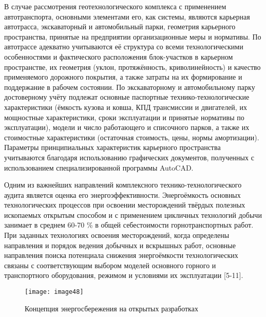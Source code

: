 \begin{multicols}{2}
В случае рассмотрения геотехнологического комплекса с применением
автотранспорта, основными элементами его, как системы, являются
карьерная автотрасса, экскаваторный и автомобильный парки, геометрия
карьерного пространства, принятые на предприятии организационные меры и
нормативы. По автотрассе адекватно учитываются её структура со всеми
технологическими особенностями и фактического расположения блок-участков
в карьерном пространстве, их геометрия (уклон, протяжённость,
криволинейность) и качество применяемого дорожного покрытия, а также
затраты на их формирование и поддержание в рабочем состоянии. По
экскаваторному и автомобильному парку достоверному учёту подлежат
основные паспортные технико-технологические характеристики (ёмкость
кузова и ковша, КПД трансмиссии и двигателей, их мощностные
характеристики, сроки эксплуатации и принятые нормативы по
эксплуатации), модели и число работающего и списочного парков, а также
их стоимостные характеристики (остаточная стоимость, цены, нормы
амортизации). Параметры принципиальных характеристик карьерного
пространства учитываются благодаря использованию графических документов,
полученных с использованием специализированной программы AutoCAD.

Одним из важнейших направлений комплексного технико-технологического
аудита является оценка его энергоэффективности. Энергоёмкость основных
технологических процессов при освоении месторождений твёрдых полезных
ископаемых открытым способом и с применением цикличных технологий добычи
занимает в среднем 60-70 \% в общей себестоимости горнотранспортных
работ. При заданных технологиях освоения месторождений, когда определены
направления и порядок ведения добычных и вскрышных работ, основные
направления поиска потенциала снижения энергоёмкости технологических
связаны с соответствующим выбором моделей основного горного и
транспортного оборудования, режимом и условиями их эксплуатации
{[}5-11{]}.

\end{multicols}

\begin{figure}[H]
    \centering
    \texttt{[image: image48]}
    \caption{Концепция энергосбережения на открытых разработках}
\end{figure}

